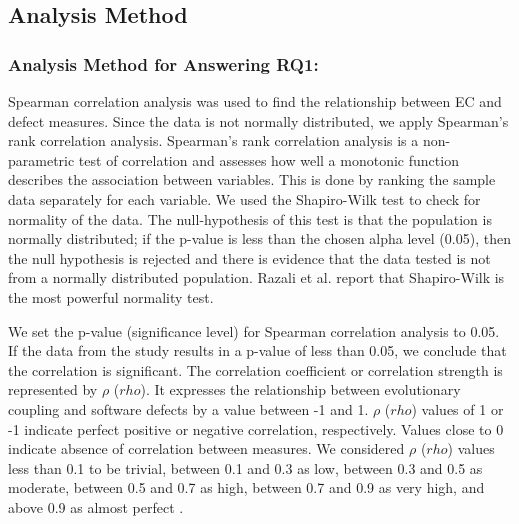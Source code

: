 \documentclass[times]{smrauth}
\begin{document}

 
\subsection{Analysis Method}

\subsubsection{Analysis Method for Answering RQ1: }


Spearman correlation analysis was used to find the relationship between EC and defect measures. Since the data is not normally distributed, we apply Spearman's rank correlation analysis. Spearman's rank correlation analysis is a non-parametric test of correlation and assesses how well a monotonic function describes the association between variables. This is done by ranking the sample data separately for each variable. We used the Shapiro-Wilk test \cite{shapiro1965analysis} to check for normality of the data. The null-hypothesis of this test is that the population is normally distributed; if the p-value is less than the chosen alpha level (0.05), then the null hypothesis is rejected and there is evidence that the data tested is not from a normally distributed population. Razali et al. \cite{razali2011power} report that Shapiro-Wilk is the most powerful normality test. 

We set the p-value (significance level) for Spearman correlation analysis to 0.05. If the data from the study results in a p-value of less than 0.05, we conclude that the correlation is significant. The correlation coefficient or correlation strength is represented by $\rho$ ($rho$). It expresses the relationship between evolutionary coupling and software defects by a value between -1 and 1. $\rho$ ($rho$) values of 1 or -1 indicate perfect positive or negative correlation, respectively. Values close to 0 indicate absence of correlation between measures. We considered $\rho$ ($rho$) values less than 0.1 to be trivial, between 0.1 and 0.3 as low, between 0.3 and 0.5 as moderate, between 0.5 and 0.7 as high, between 0.7 and 0.9 as very high, and above 0.9 as almost perfect \cite{HopkinsCorrelation} \cite{OOMetricsToPredict2012}.
\end{document}
